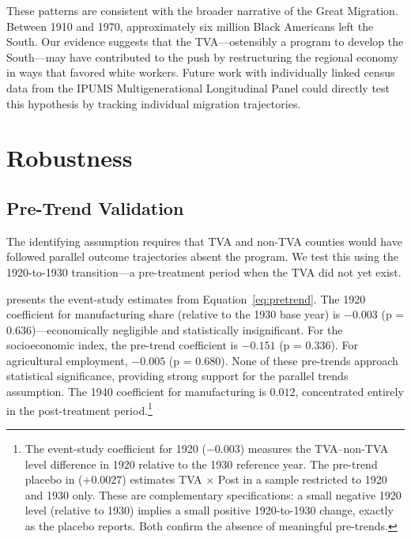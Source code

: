 \documentclass[12pt]{article}
\begin{document}
These patterns are consistent with the broader narrative of the Great Migration. Between 1910 and 1970, approximately six million Black Americans left the South. Our evidence suggests that the TVA---ostensibly a program to develop the South---may have contributed to the push by restructuring the regional economy in ways that favored white workers. Future work with individually linked census data from the IPUMS Multigenerational Longitudinal Panel could directly test this hypothesis by tracking individual migration trajectories.


\section{Robustness}\label{sec:robustness}

\subsection{Pre-Trend Validation}

The identifying assumption requires that TVA and non-TVA counties would have followed parallel outcome trajectories absent the program. We test this using the 1920-to-1930 transition---a pre-treatment period when the TVA did not yet exist.

 presents the event-study estimates from Equation~\eqref{eq:pretrend}. The 1920 coefficient for manufacturing share (relative to the 1930 base year) is $-0.003$ (p = 0.636)---economically negligible and statistically insignificant. For the socioeconomic index, the pre-trend coefficient is $-0.151$ (p = 0.336). For agricultural employment, $-0.005$ (p = 0.680). None of these pre-trends approach statistical significance, providing strong support for the parallel trends assumption. The 1940 coefficient for manufacturing is $0.012$, concentrated entirely in the post-treatment period.\footnote{The event-study coefficient for 1920 ($-0.003$) measures the TVA--non-TVA level difference in 1920 relative to the 1930 reference year. The pre-trend placebo in  ($+0.0027$) estimates TVA $\times$ Post in a sample restricted to 1920 and 1930 only. These are complementary specifications: a small negative 1920 level (relative to 1930) implies a small positive 1920-to-1930 change, exactly as the placebo reports. Both confirm the absence of meaningful pre-trends.}
\end{document}
